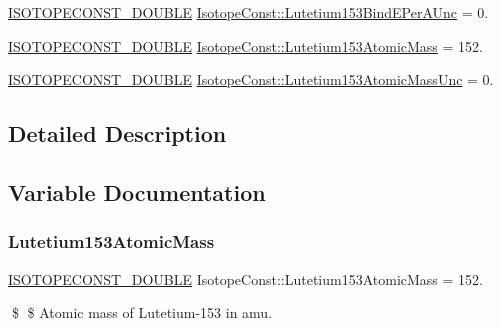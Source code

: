 \begin{DoxyCompactItemize}
\mbox{\hyperlink{group___isotope_const-_macros_ga8f45a7272ce02c0b4c65c44636ed719a}{I\+S\+O\+T\+O\+P\+E\+C\+O\+N\+S\+T\+\_\+\+D\+O\+U\+B\+LE}} \mbox{\hyperlink{group___isotope_const-_lutetium-_lu153_ga8af14f51a150aae6ac2519ef89f83784}{Isotope\+Const\+::\+Lutetium153\+Bind\+E\+Per\+A\+Unc}} = 0.
\item 
\mbox{\hyperlink{group___isotope_const-_macros_ga8f45a7272ce02c0b4c65c44636ed719a}{I\+S\+O\+T\+O\+P\+E\+C\+O\+N\+S\+T\+\_\+\+D\+O\+U\+B\+LE}} \mbox{\hyperlink{group___isotope_const-_lutetium-_lu153_gad5b3d81965edd36ff3f24bdd4561ce74}{Isotope\+Const\+::\+Lutetium153\+Atomic\+Mass}} = 152.
\item 
\mbox{\hyperlink{group___isotope_const-_macros_ga8f45a7272ce02c0b4c65c44636ed719a}{I\+S\+O\+T\+O\+P\+E\+C\+O\+N\+S\+T\+\_\+\+D\+O\+U\+B\+LE}} \mbox{\hyperlink{group___isotope_const-_lutetium-_lu153_ga474940606515bb8e601a407731750232}{Isotope\+Const\+::\+Lutetium153\+Atomic\+Mass\+Unc}} = 0.
\end{DoxyCompactItemize}


\subsection{Detailed Description}


\subsection{Variable Documentation}
\mbox{\label{group___isotope_const-_lutetium-_lu153_gad5b3d81965edd36ff3f24bdd4561ce74}} 
\subsubsection{\texorpdfstring{Lutetium153\+Atomic\+Mass}{Lutetium153AtomicMass}}
{\footnotesize\ttfamily \mbox{\hyperlink{group___isotope_const-_macros_ga8f45a7272ce02c0b4c65c44636ed719a}{I\+S\+O\+T\+O\+P\+E\+C\+O\+N\+S\+T\+\_\+\+D\+O\+U\+B\+LE}} Isotope\+Const\+::\+Lutetium153\+Atomic\+Mass = 152.}

\$ \$ Atomic mass of Lutetium-\/153 in amu. \mbox{\label{group___isotope_const-_lutetium-_lu153_ga474940606515bb8e601a407731750232}} 
